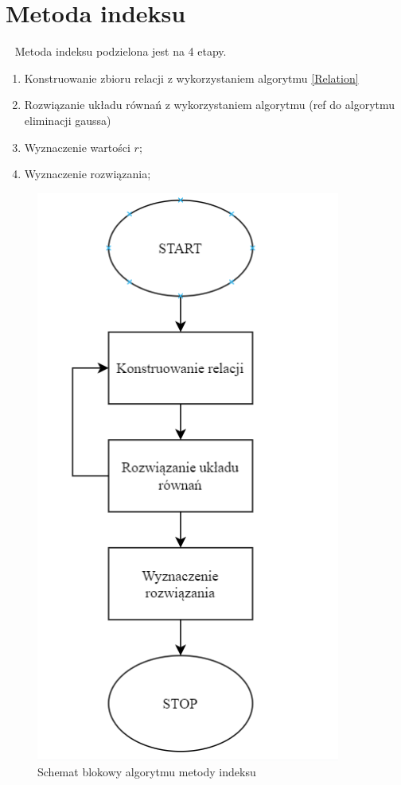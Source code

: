 \documentclass[]{article}
\begin{document}
\section{Metoda indeksu}~
	Metoda indeksu podzielona jest na 4 etapy. 
	\begin{enumerate}
		\item Konstruowanie zbioru relacji z wykorzystaniem algorytmu \ref{Relation}
		\item Rozwiązanie układu równań z wykorzystaniem algorytmu (ref do algorytmu eliminacji gaussa)
		\item Wyznaczenie wartości \(r\);
		\item Wyznaczenie rozwiązania;
	\end{enumerate}
	\begin{figure}[h]
		\begin{center}
			\includegraphics[width=10cm]{./img/schemat_1.png}
			\caption{Schemat blokowy algorytmu metody indeksu}
		\end{center}
	\end{figure}
\end{document}
